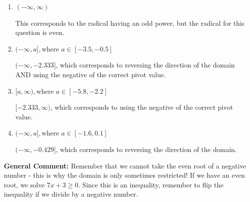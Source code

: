 \documentclass{extbook}[14pt]
\begin{document}
\begin{enumerate}
{\begin{enumerate}[label=\Alph*.]
* $[-0.429, \infty)$, which is the correct option.
\item \( (-\infty, \infty) \)

This corresponds to the radical having an odd power, but the radical for this question is even.
\item \( (-\infty, a], \text{where } a \in [-3.5, -0.5] \)

$(-\infty, -2.333]$, which corresponds to reversing the direction of the domain AND using the negative of the correct pivot value.
\item \( [a, \infty), \text{where } a \in [-5.8, -2.2] \)

$[-2.333, \infty)$, which corresponds to using the negative of the correct pivot value.
\item \( (-\infty, a], \text{where } a \in [-1.6, 0.1] \)

 $(-\infty, -0.429]$, which corresponds to reversing the direction of the domain.
\end{enumerate}

\textbf{General Comment:} Remember that we cannot take the even root of a negative number - this is why the domain is only sometimes restricted! If we have an even root, we solve $7 x + 3 \geq 0$. Since this is an inequality, remember to flip the inequality if we divide by a negative number.
}
\end{enumerate}
\end{document}
